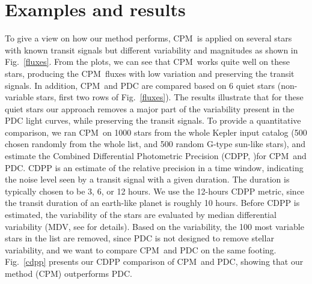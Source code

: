 \documentclass[12pt, preprint]{aastex}
\newcommand{\name}{CPM}
\begin{document}
\clearpage

\section{Examples and results}

To give a view on how our method performs, \name\ is applied on several stars with 
known transit signals but different variability and magnitudes as shown in Fig.~\ref{fluxes}. 
From the plots, we can see that \name\ works quite well on these stars, producing the \name\ fluxes 
with low variation and preserving the transit signals.
In addition, \name\ and PDC are compared based on 6 quiet stars 
(non-variable stars, first two rows of Fig.~\ref{fluxes}). 
The results illustrate that for these quiet stars our approach removes 
a major part of the variability present in the PDC light curves, while preserving the transit signals. 
To provide a quantitative comparison, we ran \name\ on 1000 stars from the whole Kepler input catalog 
(500 chosen randomly from the whole list, and 500 random G-type sun-like stars), 
and estimate the Combined Differential Photometric Precision (CDPP,  \cite{cdpp1} )for \name\ and PDC. 
CDPP is an estimate of the relative precision in a time window, 
indicating the noise level seen by a transit signal with a given duration. 
The duration is typically chosen to be 3, 6, or 12 hours. 
We use the 12-hours CDPP metric, since the transit duration of an earth-like planet is roughly 10 hours. 
Before CDPP is estimated, the variability of the stars are evaluated by median differential variability 
  (MDV, see \cite{basri2013} for details). 
Based on the variability, the 100 most variable stars in the list are removed, 
  since PDC is not designed to remove stellar variability, 
  and we want to compare \name\ and PDC on the same footing.
Fig.~\ref{cdpp} presents our CDPP comparison of \name\ and PDC, showing that our method (\name) outperforms PDC. 
\end{document}
